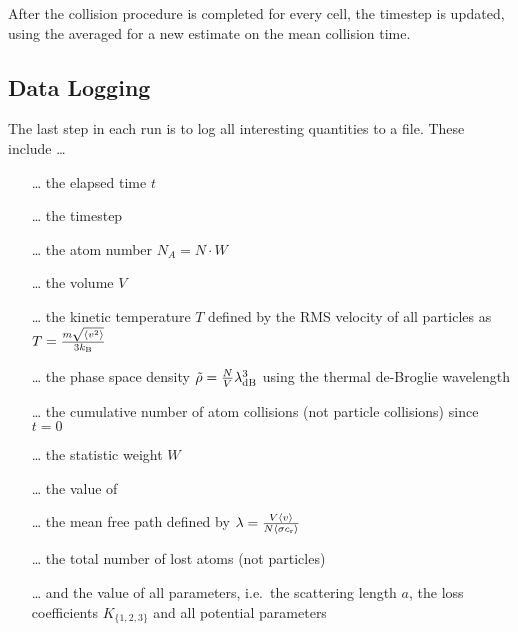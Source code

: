 After the collision procedure is completed for every cell, the timestep \Dt is updated, using the averaged \meanProb for a new estimate on the mean collision time.

\subsection{Data Logging}
The last step in each run is to log all interesting quantities to a file. These include \ldots 
\begin{itemize}
    \item[\ldots] the elapsed time $t$
    \item[\ldots] the timestep \Dt
    \item[\ldots] the atom number $N_A = N\cdot W$
    \item[\ldots] the volume $V$
    \item[\ldots] the kinetic temperature $T$ defined by the RMS velocity of all particles as $T = \frac{m\sqrt{\langle v^2\rangle}}{3k_\text{B}}$
    \item[\ldots] the phase space density $\tilde{\rho} = \frac{N}{V}\lambda_\text{dB}^3$ using the thermal de-Broglie wavelength \lambdadB
    \item[\ldots] the cumulative number of atom collisions (not particle collisions) since $t=0$
    \item[\ldots] the statistic weight $W$
    \item[\ldots] the value of \maxProb
    \item[\ldots] the mean free path defined by $\lambda = \frac{V\langle v\rangle}{N\langle\sigma c_\text{r}\rangle}$
    \item[\ldots] the total number of lost atoms (not particles)
    \item[\ldots] and the value of all parameters, i.e.\ the scattering length $a$, the loss coefficients $K_{\{1,2,3\}}$ and all potential parameters     
\end{itemize}
